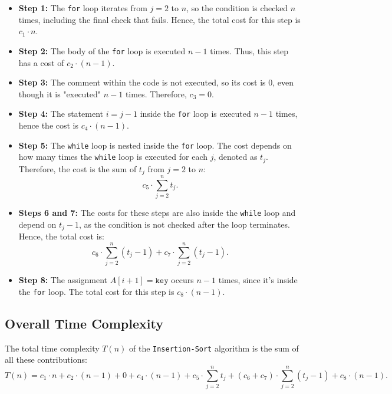     \begin{itemize}
        \item \textbf{Step 1:} The \texttt{for} loop iterates from $j = 2$ to $n$, so the condition is checked $n$ times, including the final check that fails. Hence, the total cost for this step is $c_1 \cdot n$.
        
        \item \textbf{Step 2:} The body of the \texttt{for} loop is executed $n-1$ times. Thus, this step has a cost of $c_2 \cdot (n-1)$.
        
        \item \textbf{Step 3:} The comment within the code is not executed, so its cost is $0$, even though it is "executed" $n-1$ times. Therefore, $c_3 = 0$.
        
        \item \textbf{Step 4:} The statement $i = j-1$ inside the \texttt{for} loop is executed $n-1$ times, hence the cost is $c_4 \cdot (n-1)$.
        
        \item \textbf{Step 5:} The \texttt{while} loop is nested inside the \texttt{for} loop. The cost depends on how many times the \texttt{while} loop is executed for each $j$, denoted as $t_j$. Therefore, the cost is the sum of $t_j$ from $j=2$ to $n$: 
        \[
        c_5 \cdot \sum_{j=2}^{n} t_j.
        \]
        
        \item \textbf{Steps 6 and 7:} The costs for these steps are also inside the \texttt{while} loop and depend on $t_j-1$, as the condition is not checked after the loop terminates. Hence, the total cost is:
        \[
        c_6 \cdot \sum_{j=2}^{n} (t_j - 1) + c_7 \cdot \sum_{j=2}^{n} (t_j - 1).
        \]
        
        \item \textbf{Step 8:} The assignment $A[i+1] = \texttt{key}$ occurs $n-1$ times, since it's inside the \texttt{for} loop. The total cost for this step is $c_8 \cdot (n-1)$.
    \end{itemize}
    
    \subsection{Overall Time Complexity}
    The total time complexity $T(n)$ of the \texttt{Insertion-Sort} algorithm is the sum of all these contributions:
    \[
    T(n) = c_1 \cdot n + c_2 \cdot (n-1) + 0 + c_4 \cdot (n-1) + c_5 \cdot \sum_{j=2}^{n} t_j + (c_6 + c_7) \cdot \sum_{j=2}^{n} (t_j - 1) + c_8 \cdot (n-1).
    \]
    
